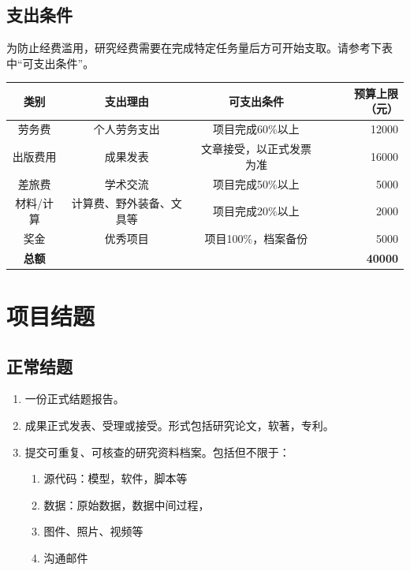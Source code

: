 \documentclass[
]{book}
\providecommand{\tightlist}{%
  \setlength{\itemsep}{0pt}\setlength{\parskip}{0pt}}
\begin{document}
\hypertarget{ux652fux51faux6761ux4ef6}{%
\section{支出条件}\label{ux652fux51faux6761ux4ef6}}

为防止经费滥用，研究经费需要在完成特定任务量后方可开始支取。请参考下表中``可支出条件''。

\begin{longtable}[]{@{}cccr@{}}
\toprule\noalign{}
类别 & 支出理由 & 可支出条件 & 预算上限（元） \\
\midrule\noalign{}
\endhead
\bottomrule\noalign{}
\endlastfoot
劳务费 & 个人劳务支出 & 项目完成60\%以上 & 12000 \\
出版费用 & 成果发表 & 文章接受，以正式发票为准 & 16000 \\
差旅费 & 学术交流 & 项目完成50\%以上 & 5000 \\
材料/计算 & 计算费、野外装备、文具等 & 项目完成20\%以上 & 2000 \\
奖金 & 优秀项目 & 项目100\%，档案备份 & 5000 \\
\textbf{总额} & & & \textbf{40000} \\
\end{longtable}

\hypertarget{ux9879ux76eeux7ed3ux9898}{%
\chapter{项目结题}\label{ux9879ux76eeux7ed3ux9898}}

\hypertarget{ux6b63ux5e38ux7ed3ux9898}{%
\section{正常结题}\label{ux6b63ux5e38ux7ed3ux9898}}

\begin{enumerate}
\def\labelenumi{\arabic{enumi}.}
\tightlist
\item
  一份正式结题报告。
\item
  成果正式发表、受理或接受。形式包括研究论文，软著，专利。
\item
  提交可重复、可核查的研究资料档案。包括但不限于：

  \begin{enumerate}
  \def\labelenumii{\arabic{enumii}.}
  \tightlist
  \item
    源代码：模型，软件，脚本等
  \item
    数据：原始数据，数据中间过程，
  \item
    图件、照片、视频等
  \item
    沟通邮件
  \end{enumerate}
\end{enumerate}
\end{document}
